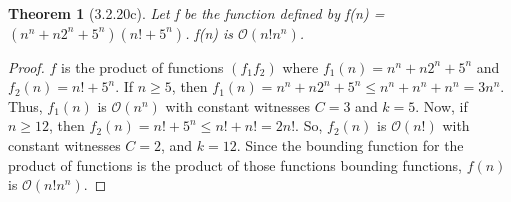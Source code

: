 \documentclass[a4paper, 12pt]{article}
\theoremstyle{plain}
\newtheorem*{theorem*}{Theorem}
\begin{document}
	
	\begin{theorem*}[3.2.20c]
		Let f be the function defined by \newline f(n) = $(n^n + n2^n + 5^n)(n! + 5^n)$. f(n) is $\mathcal{O}(n!n^n)$.
	\end{theorem*}
	
	\begin{proof}
		$f$ is the product of functions $(f_1 f_2)$ where $f_1(n) = n^n + n2^n + 5^n$ and $f_2(n) = n! + 5^n$. If $n \ge 5$, then \newline \newline \indent $f_1(n) = n^n + n2^n + 5^n \le n^n + n^n + n^n = 3n^n$. \newline \newline Thus, $f_1(n)$ is $\mathcal{O}(n^n)$ with constant witnesses $C = 3$ and $k = 5$. Now, if $n \ge 12$, then \newline \newline \indent $f_2(n) = n! + 5^n \le n! + n! = 2n!$. \newline \newline So, $f_2(n)$ is $\mathcal{O}(n!)$ with constant witnesses $C = 2$, and $k = 12$. Since the bounding function for the product of functions is the product of those functions bounding functions, $f(n)$ is $\mathcal{O}(n!n^n)$.
	\end{proof}
\end{document}
